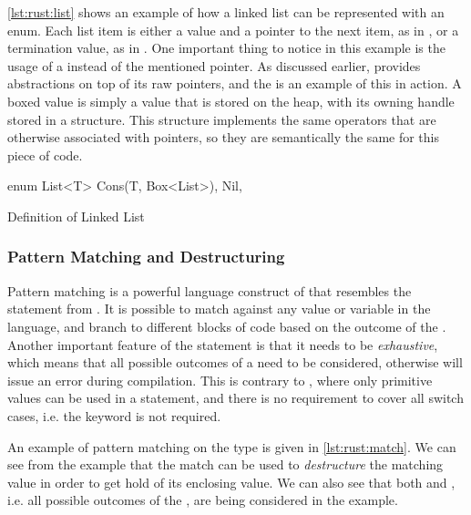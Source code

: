 \autoref{lst:rust:list} shows an example of how a linked list can be represented with an enum.
Each list item is either a value and a pointer to the next item, as in , or a termination value, as in .
One important thing to notice in this example is the usage of a  instead of the mentioned pointer.
As discussed earlier, {\rust} provides abstractions on top of its raw pointers, and the  is an example of this in action.
A boxed value is simply a value that is stored on the heap, with its owning handle stored in a  structure.
This structure implements the same operators that are otherwise associated with pointers, so they are semantically the same for this piece of code.

\begin{listing}[H]
  \begin{rustcode}
enum List<T> {
  Cons(T, Box<List>),
  Nil,
}
  \end{rustcode}
  \caption{Definition of Linked List}
  \label{lst:rust:list}
\end{listing}

\subsubsection{Pattern Matching and Destructuring}
\label{sub:pattern_matching}

Pattern matching is a powerful language construct of {\rust} that resembles the  statement from {\C}.
It is possible to match against any value or variable in the language, and branch to different blocks of code based on the outcome of the .
Another important feature of the  statement is that it needs to be \emph{exhaustive}, which means that all possible outcomes of a  need to be considered, otherwise {\rust} will issue an error during compilation.
This is contrary to {\C}, where only primitive values can be used in a  statement, and there is no requirement to cover all switch cases, i.e. the  keyword is not required.

An example of pattern matching on the  type is given in \autoref{lst:rust:match}.
We can see from the example that the match can be used to \emph{destructure} the matching value in order to get hold of its enclosing value.
We can also see that both  and , i.e. all possible outcomes of the , are being considered in the example.

